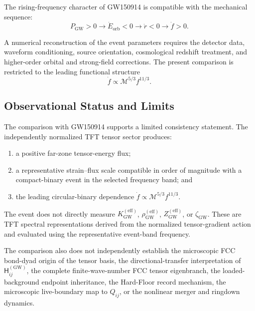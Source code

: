 The rising-frequency character of GW150914 is compatible with the mechanical sequence:
\begin{equation}
    P_{\mathrm{GW}} > 0 \longrightarrow \dot{E}_{\mathrm{orb}} < 0 \longrightarrow \dot{r} < 0 \longrightarrow \dot{f} > 0.
\end{equation}

A numerical reconstruction of the event parameters requires the detector data, waveform conditioning, source orientation, cosmological redshift treatment, and higher-order orbital and strong-field corrections. The present comparison is restricted to the leading functional structure
\begin{equation}
    \dot{f} \propto \mathcal{M}^{5/3}f^{11/3}.
    \label{eq:n11_leading_chirp_scaling}
\end{equation}

\subsection{Observational Status and Limits}
\label{subsec:n11_event_test_scope}

The comparison with GW150914 supports a limited consistency statement. The independently normalized TFT tensor sector produces:
\begin{enumerate}
    \item a positive far-zone tensor-energy flux;
    \item a representative strain--flux scale compatible in order of magnitude with a compact-binary event in the selected frequency band; and
    \item the leading circular-binary dependence $\dot{f} \propto \mathcal{M}^{5/3}f^{11/3}$.
\end{enumerate}

The event does not directly measure $K_{\mathrm{GW}}^{(\mathrm{eff})}$, $\rho_{\mathrm{GW}}^{(\mathrm{eff})}$, $Z_{\mathrm{GW}}^{(\mathrm{eff})}$, or $\zeta_{\mathrm{GW}}$. These are TFT spectral representations derived from the normalized tensor-gradient action and evaluated using the representative event-band frequency.

The comparison also does not independently establish the microscopic FCC bond-dyad origin of the tensor basis, the directional-transfer interpretation of $\mathsf{H}_{ij}^{(\mathrm{GW})}$, the complete finite-wave-number FCC tensor eigenbranch, the loaded-background endpoint inheritance, the Hard-Floor record mechanism, the microscopic live-boundary map to $Q_{ij}$, or the nonlinear merger and ringdown dynamics.

